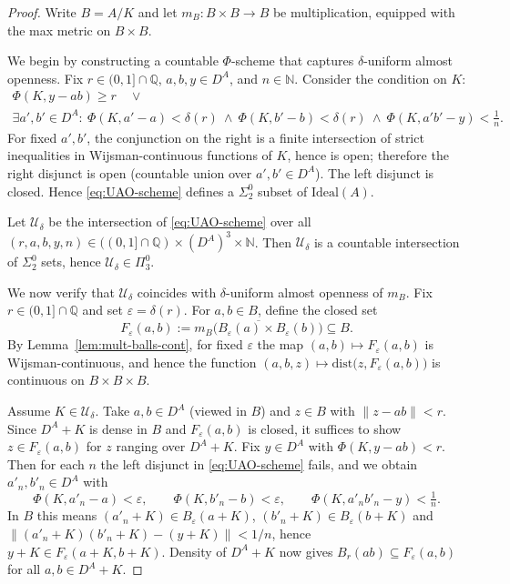 \documentclass[12pt,fleqn,a4paper]{amsart}
\renewcommand{\ge}{\geqslant}
\numberwithin{equation}{section}
\theoremstyle{definition}
\newcommand{\N}{\mathbb{N}}
\newcommand{\Q}{\mathbb{Q}}
\newcommand{\Ideal}{\mathrm{Ideal}}
\newcommand{\dist}{\mathrm{dist}}
\begin{document}
\begin{proof}
Write $B=A/K$ and let $m_B:B\times B\to B$ be multiplication, equipped with the max metric
on $B\times B$.

We begin by constructing a countable $\Phi$-scheme that captures
$\delta$-uniform almost openness.
Fix $r\in(0,1]\cap\Q$, $a,b,y\in D^A$, and $n\in\N$.
Consider the condition on $K$:
\begin{multline}\label{eq:UAO-scheme}
\Phi(K,y-ab)\ge r
\quad\lor\\
\exists a',b'\in D^A:\ 
\Phi(K,a'-a)<\delta(r)\ \wedge\ \Phi(K,b'-b)<\delta(r)
\ \wedge\ \Phi(K,a'b'-y)<\tfrac1n .
\end{multline}
For fixed $a',b'$, the conjunction on the right is a finite intersection of strict
inequalities in Wijsman-continuous functions of $K$, hence is open; therefore the right
disjunct is open (countable union over $a',b'\in D^A$).
The left disjunct is closed. Hence \eqref{eq:UAO-scheme} defines a $\Sigma^0_2$ subset of
$\Ideal(A)$.

Let $\mathcal U_\delta$ be the intersection of \eqref{eq:UAO-scheme} over all
$(r,a,b,y,n)\in ((0,1]\cap\Q)\times(D^A)^3\times\N$.
Then $\mathcal U_\delta$ is a countable intersection of $\Sigma^0_2$ sets, hence
$\mathcal U_\delta\in\Pi^0_3$.

We now verify that $\mathcal U_\delta$ coincides with
$\delta$-uniform almost openness of $m_B$.
Fix $r\in(0,1]\cap\Q$ and set $\varepsilon=\delta(r)$.
For $a,b\in B$, define the closed set
\[
F_\varepsilon(a,b):=\overline{m_B\bigl(B_\varepsilon(a)\times B_\varepsilon(b)\bigr)}
\subseteq B.
\]
By Lemma~\ref{lem:mult-balls-cont}, for fixed $\varepsilon$ the map
$(a,b)\mapsto F_\varepsilon(a,b)$
is Wijsman-continuous, and hence the function
$(a,b,z)\mapsto \dist\bigl(z,F_\varepsilon(a,b)\bigr)$
is continuous on $B\times B\times B$.

Assume $K\in\mathcal U_\delta$.
Take $a,b\in D^A$ (viewed in $B$) and $z\in B$ with $\|z-ab\|<r$.
Since $D^A+K$ is dense in $B$ and $F_\varepsilon(a,b)$ is closed, it suffices to show
$z\in F_\varepsilon(a,b)$ for $z$ ranging over $D^A+K$.
Fix $y\in D^A$ with $\Phi(K,y-ab)<r$.
Then for each $n$ the left disjunct in \eqref{eq:UAO-scheme} fails, and we obtain
$a'_n,b'_n\in D^A$ with
\[
\Phi(K,a'_n-a)<\varepsilon,\qquad \Phi(K,b'_n-b)<\varepsilon,\qquad
\Phi(K,a'_nb'_n-y)<\tfrac1n.
\]
In $B$ this means $(a'_n+K)\in B_\varepsilon(a+K)$, $(b'_n+K)\in B_\varepsilon(b+K)$ and
$\|(a'_n+K)(b'_n+K)-(y+K)\|<1/n$, hence $y+K\in F_\varepsilon(a+K,b+K)$.
Density of $D^A+K$ now gives $B_r(ab)\subseteq F_\varepsilon(a,b)$ for all
$a,b\in D^A+K$.


\end{proof}
\end{document}
